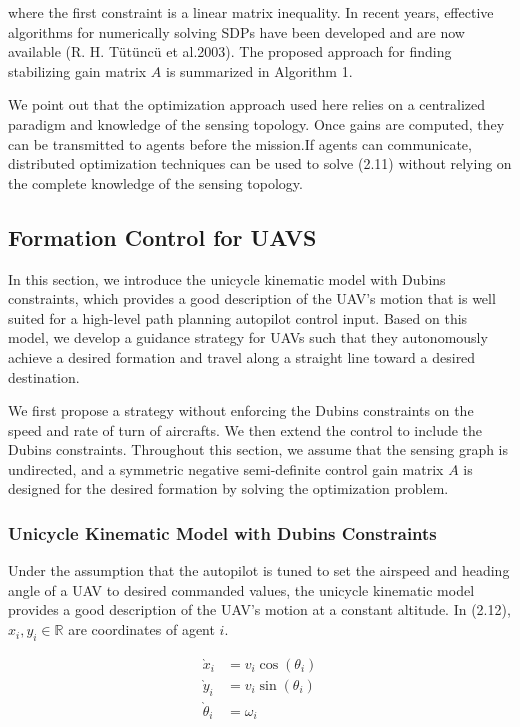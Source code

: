 \documentclass[10pt]{article}
\begin{document}
where the first constraint is a linear matrix inequality. In recent years, effective algorithms for numerically solving SDPs have been developed and are now available (R. H. Tütüncü et al.2003). The proposed approach for finding stabilizing gain matrix $A$ is summarized in Algorithm 1.

We point out that the optimization approach used here relies on a centralized paradigm and knowledge of the sensing topology. Once gains are computed, they can be transmitted to agents before the mission.If agents can communicate, distributed optimization techniques can be used to solve (2.11) without relying on the complete knowledge of the sensing topology.

\subsection{Formation Control for UAVS}
In this section, we introduce the unicycle kinematic model with Dubins constraints, which provides a good description of the UAV's motion that is well suited for a high-level path planning autopilot control input. Based on this model, we develop a guidance strategy for UAVs such that they autonomously achieve a desired formation and travel along a straight line toward a desired destination.

We first propose a strategy without enforcing the Dubins constraints on the speed and rate of turn of aircrafts. We then extend the control to include the Dubins constraints. Throughout this section, we assume that the sensing graph is undirected, and a symmetric negative semi-definite control gain matrix $A$ is designed for the desired formation by solving the optimization problem.

\subsubsection{Unicycle Kinematic Model with Dubins Constraints}
Under the assumption that the autopilot is tuned to set the airspeed and heading angle of a UAV to desired commanded values, the unicycle kinematic model provides a good description of the UAV's motion at a constant altitude. In (2.12), $x_{i}, y_{i} \in \mathbb{R}$ are coordinates of agent $i$.

$$
\begin{aligned}
\grave{x}_{i} & =v_{i} \cos \left(\theta_{i}\right) \\
\grave{y}_{i} & =v_{i} \sin \left(\theta_{i}\right) \\
\grave{\theta}_{i} & =\omega_{i}
\end{aligned}
$$
\end{document}
